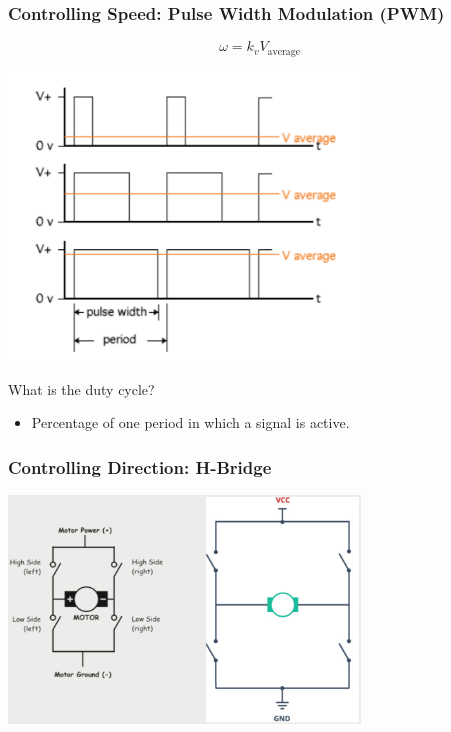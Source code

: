 \documentclass[10pt]{article}
\begin{document}
\subsubsection*{Controlling Speed: Pulse Width Modulation (PWM)}
\[\omega = k_v V_{\text{average}}\]
\begin{center} 
	\includegraphics*[width=0.7\textwidth]{L2_16.png} 
\end{center}
What is the duty cycle?
\begin{itemize}
	\item Percentage of one period in which a signal is active.
\end{itemize}

\subsubsection*{Controlling Direction: H-Bridge}
\begin{center} 
	\includegraphics*[width=0.7\textwidth]{L2_17.png} 
\end{center}
\end{document}
